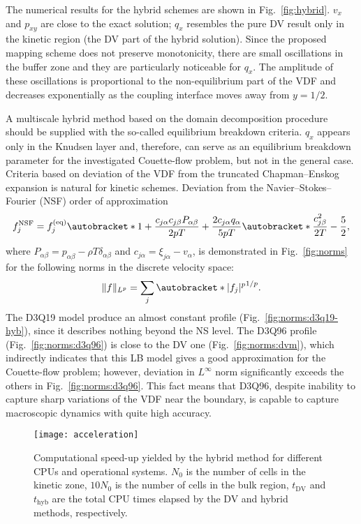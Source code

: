 \documentclass[]{elsarticle} %
\DeclarePairedDelimiter\autobracket()       %
\newcommand{\br}[1]{\autobracket*{#1}}
\newcommand{\xiai}{\xi_{j \alpha}}
\newcommand{\cai}{c_{j \alpha}}
\newcommand{\caj}{c_{j \beta}}
\newcommand{\equil}[1]{#1^\mathrm{(eq)}}
\begin{document}
{%
The numerical results for the hybrid schemes are shown in Fig.~\ref{fig:hybrid}.
\(v_x\) and \(p_{xy}\) are close to the exact solution;
\(q_x\) resembles the pure DV result only in the kinetic region (the DV part of the hybrid solution).
Since the proposed mapping scheme does not preserve monotonicity,
there are small oscillations in the buffer zone and they are particularly noticeable for \(q_x\).
The amplitude of these oscillations is proportional to the non-equilibrium part of the VDF
and decreases exponentially as the coupling interface moves away from \(y=1/2\).

A multiscale hybrid method based on the domain decomposition procedure should be supplied with the so-called equilibrium breakdown criteria.
\(q_x\) appears only in the Knudsen layer and, therefore, can serve as an equilibrium breakdown parameter
for the investigated Couette-flow problem, but not in the general case.
Criteria based on deviation of the VDF from the truncated Chapman--Enskog expansion is natural for kinetic schemes.
Deviation from the Navier--Stokes--Fourier (NSF) order of approximation~\cite{Zhang2014}
\begin{equation}\label{eq:NSF}
    f^{\mathrm{NSF}}_j = \equil{f}_j\br{
        1 + \frac{\cai\caj P_{\alpha\beta}}{2pT} + \frac{2\cai q_\alpha}{5pT}\br{\frac{\caj^2}{2T} - \frac52} },
\end{equation}
where \(P_{\alpha\beta} = p_{\alpha\beta} - \rho T\delta_{\alpha\beta}\) and \(\cai = \xiai - v_\alpha\),
is demonstrated in Fig.~\ref{fig:norms} for the following norms in the discrete velocity space:
\begin{equation}\label{eq:norms}
    \|f\|_{L^p} = \sum_j \br{|f_j|^p}^{1/p}.
\end{equation}
The D3Q19 model produce an almost constant profile (Fig.~\ref{fig:norms:d3q19-hyb}), since it describes nothing beyond the NS level.
The D3Q96 profile (Fig.~\ref{fig:norms:d3q96}) is close to the DV one (Fig.~\ref{fig:norms:dvm}),
which indirectly indicates that this LB model gives a good approximation for the Couette-flow problem;
however, deviation in \(L^\infty\) norm significantly exceeds the others in Fig.~\ref{fig:norms:d3q96}.
This fact means that D3Q96, despite inability to capture sharp variations of the VDF near the boundary,
is capable to capture macroscopic dynamics with quite high accuracy.

\begin{figure}
    \centering
    \texttt{[image: acceleration]}
    \caption{
        Computational speed-up yielded by the hybrid method for different CPUs and operational systems.
        $N_0$ is the number of cells in the kinetic zone, $10N_0$ is the number of cells in the bulk region,
        $t_\mathrm{DV}$ and $t_\mathrm{hyb}$ are the total CPU times elapsed by the DV and hybrid methods, respectively.
    }\label{fig:speed-up}
\end{figure}

}
\end{document}
